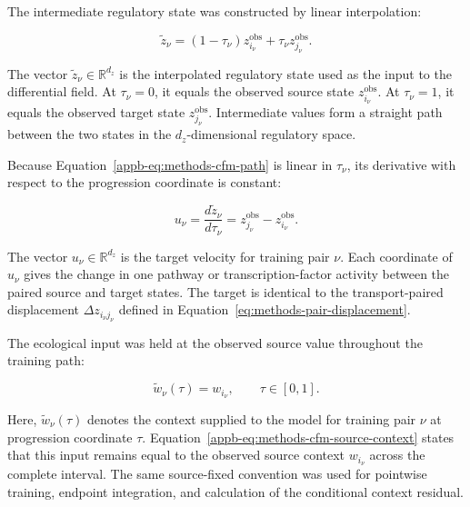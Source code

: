 The intermediate regulatory state was constructed by linear interpolation:

\begin{equation}
\widetilde{z}_\nu
=
\left(1-\tau_\nu\right)
z_{i_\nu}^{\mathrm{obs}}
+
\tau_\nu
z_{j_\nu}^{\mathrm{obs}}.
\label{appb-eq:methods-cfm-path}
\end{equation}

The vector
\(\widetilde{z}_\nu\in\mathbb{R}^{d_z}\) is the interpolated regulatory state
used as the input to the differential field. At \(\tau_\nu=0\), it equals the
observed source state \(z_{i_\nu}^{\mathrm{obs}}\). At \(\tau_\nu=1\), it
equals the observed target state \(z_{j_\nu}^{\mathrm{obs}}\). Intermediate
values form a straight path between the two states in the
\(d_z\)-dimensional regulatory space.

Because Equation~\ref{appb-eq:methods-cfm-path} is linear in \(\tau_\nu\), its
derivative with respect to the progression coordinate is constant:

\begin{equation}
u_\nu
=
\frac{d\widetilde{z}_\nu}{d\tau_\nu}
=
z_{j_\nu}^{\mathrm{obs}}
-
z_{i_\nu}^{\mathrm{obs}}.
\label{appb-eq:methods-cfm-target}
\end{equation}

The vector \(u_\nu\in\mathbb{R}^{d_z}\) is the target velocity for training
pair \(\nu\). Each coordinate of \(u_\nu\) gives the change in one pathway or
transcription-factor activity between the paired source and target states.
The target is identical to the transport-paired displacement
\(\Delta z_{i_\nu j_\nu}\) defined in
Equation~\ref{eq:methods-pair-displacement}.

The ecological input was held at the observed source value throughout the
training path:

\begin{equation}
\widetilde{w}_\nu(\tau)
=
w_{i_\nu},
\qquad
\tau\in[0,1].
\label{appb-eq:methods-cfm-source-context}
\end{equation}

Here, \(\widetilde{w}_\nu(\tau)\) denotes the context supplied to the model
for training pair \(\nu\) at progression coordinate \(\tau\).
Equation~\ref{appb-eq:methods-cfm-source-context} states that this input remains
equal to the observed source context \(w_{i_\nu}\) across the complete
interval. The same source-fixed convention was used for pointwise training,
endpoint integration, and calculation of the conditional context residual.

